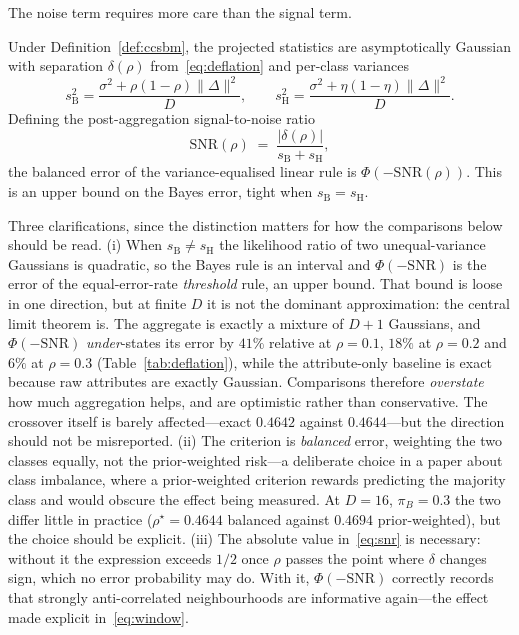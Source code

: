 \documentclass[../elsevier.tex]{subfiles}
\begin{document}
The noise term requires more care than the signal term.

\begin{theorem}
\label{thm:error}
Under Definition~\ref{def:ccsbm}, the projected statistics are asymptotically
Gaussian with separation $\delta(\rho)$ from~\eqref{eq:deflation} and per-class
variances
\begin{equation}
    s_{\mathrm{B}}^2 = \frac{\sigma^2 + \rho(1-\rho)\|\Delta\|^2}{D},
    \qquad
    s_{\mathrm{H}}^2 = \frac{\sigma^2 + \eta(1-\eta)\|\Delta\|^2}{D}.
    \label{eq:variances}
\end{equation}
Defining the post-aggregation signal-to-noise ratio
\begin{equation}
    \mathrm{SNR}(\rho) \;=\; \frac{|\delta(\rho)|}{s_{\mathrm{B}} + s_{\mathrm{H}}},
    \label{eq:snr}
\end{equation}
the balanced error of the variance-equalised linear rule is
$\Phi(-\mathrm{SNR}(\rho))$. This is an upper bound on the Bayes error, tight when
$s_{\mathrm{B}} = s_{\mathrm{H}}$.
\end{theorem}

\begin{remark}
\label{rem:not-bayes}
Three clarifications, since the distinction matters for how the comparisons below
should be read. (i) When $s_{\mathrm{B}} \neq s_{\mathrm{H}}$ the likelihood ratio of
two unequal-variance Gaussians is quadratic, so the Bayes rule is an interval and
$\Phi(-\mathrm{SNR})$ is the error of the equal-error-rate \emph{threshold} rule, an
upper bound. That bound is loose in one direction, but at finite $D$ it is not the
dominant approximation: the central limit theorem is. The aggregate is exactly a
mixture of $D+1$ Gaussians, and $\Phi(-\mathrm{SNR})$ \emph{under}-states its error
by $41\%$ relative at $\rho = 0.1$, $18\%$ at $\rho = 0.2$ and $6\%$ at
$\rho = 0.3$ (Table~\ref{tab:deflation}), while the attribute-only baseline is exact
because raw attributes are exactly Gaussian. Comparisons therefore \emph{overstate}
how much aggregation helps, and are optimistic rather than conservative. The
crossover itself is barely affected---exact $0.4642$ against $0.4644$---but the
direction should not be misreported.
(ii) The criterion is \emph{balanced} error, weighting the two classes equally, not
the prior-weighted risk---a deliberate choice in a paper about class imbalance,
where a prior-weighted criterion rewards predicting the majority class and would
obscure the effect being measured. At $D=16$, $\pi_B=0.3$ the two differ little in
practice ($\rho^\star = 0.4644$ balanced against $0.4694$ prior-weighted), but the
choice should be explicit. (iii) The absolute value in~\eqref{eq:snr} is necessary:
without it the expression exceeds $1/2$ once $\rho$ passes the point where
$\delta$ changes sign, which no error probability may do. With it,
$\Phi(-\mathrm{SNR})$ correctly records that strongly anti-correlated neighbourhoods
are informative again---the effect made explicit in~\eqref{eq:window}.
\end{remark}
\end{document}
